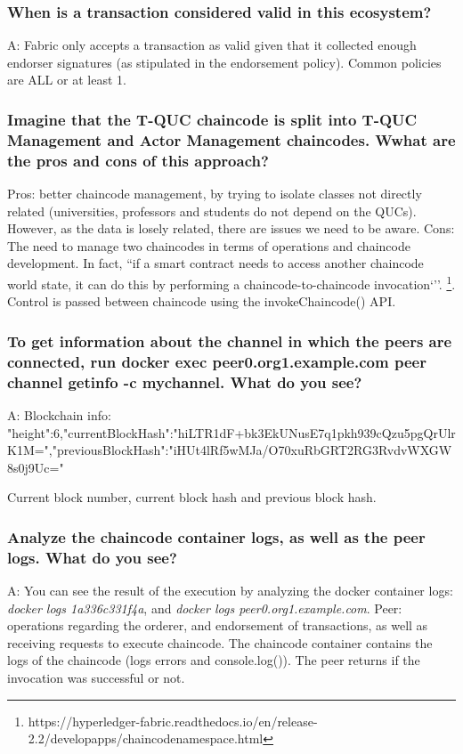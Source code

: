 \documentclass[12pt,a4paper]{article}
\begin{document}
\subsubsection*{When is a transaction considered valid in this ecosystem?}

A:  Fabric only accepts a transaction as valid given that it collected enough endorser signatures (as stipulated in the endorsement policy). Common policies are ALL or at least 1.


\subsubsection*{Imagine that the T-QUC chaincode is split into T-QUC Management and Actor Management chaincodes. Wwhat are the pros and cons of this approach?}

 Pros: better chaincode management, by trying to isolate classes not directly related (universities, professors and students do not depend on the QUCs).  However, as the data is losely related, there are issues we need to be aware.
Cons: The need to manage two chaincodes in terms of operations and chaincode development. In fact, ``if a smart contract needs to access another chaincode world state, it can do this by performing a chaincode-to-chaincode invocation`''.  \footnote{https://hyperledger-fabric.readthedocs.io/en/release-2.2/developapps/chaincodenamespace.html}. Control is passed between chaincode using the invokeChaincode() API.

\subsubsection*{To get information about the channel in which the peers are connected, run {docker exec peer0.org1.example.com peer channel getinfo -c mychannel}. What do you see?}

A: Blockchain info: {"height":6,"currentBlockHash":"hiLTR1dF+bk3EkUNusE7q1pkh939cQzu5pgQrUlrK1M=","previousBlockHash":"iHUt4lRf5wMJa/O70xuRbGRT2RG3RvdvWXGW8s0j9Uc="}

Current block number, current block hash and previous block hash. 

\subsubsection*{Analyze the chaincode container logs, as well as the peer logs. What do you see?}

A: You can see the result of the execution by analyzing the docker container logs: \emph{docker logs 1a336c331f4a}, and \emph{docker logs peer0.org1.example.com}.
Peer: operations regarding the orderer, and endorsement of transactions, as well as receiving requests to execute chaincode. The chaincode container contains the logs of the chaincode (logs errors and console.log()). The peer returns if the invocation was successful or not. 
\end{document}
